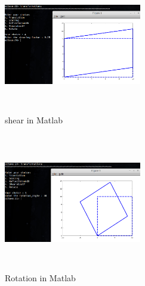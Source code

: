\begin{figure}[ht!]
\centering
\includegraphics[width=60mm, height=60mm]{shearMatlab.png}
\caption{shear in Matlab \label{overflow}}
\end{figure}
\begin{figure}[ht!]
\centering
\includegraphics[width=60mm, height=60mm]{rotationMatlab.png}
\caption{Rotation in Matlab \label{overflow}}
\end{figure}

